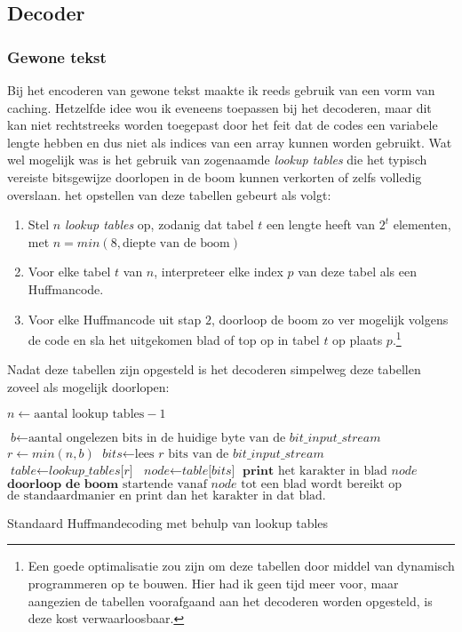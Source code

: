 \subsection{Decoder}

\subsubsection{Gewone tekst}
Bij het encoderen van gewone tekst maakte ik reeds gebruik van een vorm van caching. Hetzelfde idee wou ik eveneens toepassen bij het decoderen, maar dit kan niet rechtstreeks worden toegepast door het feit dat de codes een variabele lengte hebben en dus niet als indices van een array kunnen worden gebruikt. Wat wel mogelijk was is het gebruik van zogenaamde \emph{lookup tables} die het typisch vereiste bitsgewijze doorlopen in de boom kunnen verkorten of zelfs volledig overslaan. het opstellen van deze tabellen gebeurt als volgt:
\begin{enumerate}
	\item Stel $n$ \emph{lookup tables} op, zodanig dat tabel $t$ een lengte heeft van $2^t$ elementen, met $n = min(8, \text{diepte van de boom})$
	\item Voor elke tabel $t$ van $n$, interpreteer elke index $p$ van deze tabel als een Huffmancode.
	\item Voor elke Huffmancode uit stap $2$, doorloop de boom zo ver mogelijk volgens de code en sla het uitgekomen blad of top op in tabel $t$ op plaats $p$.\footnote{Een goede optimalisatie zou zijn om deze tabellen door middel van dynamisch programmeren op te bouwen. Hier had ik geen tijd meer voor, maar aangezien de tabellen voorafgaand aan het decoderen worden opgesteld, is deze kost verwaarloosbaar.}
\end{enumerate}
Nadat deze tabellen zijn opgesteld is het decoderen simpelweg deze tabellen zoveel als mogelijk doorlopen:
\begin{algorithm}
	\begin{algorithmic}[1]
		\State $\textit{n} \gets \text{aantal lookup tables} - 1$
		
		\State $\textit{b} \gets \text{aantal ongelezen bits in de huidige byte van de }\textit{bit\_input\_stream}$
		\State $\textit{r} \gets min(n, b)$
		\State $\textit{bits} \gets \text{lees }\textit{r}\text{ bits van de } \textit{bit\_input\_stream}$
		\State $\textit{table} \gets \textit{lookup\_tables[r]}$
		\State $\textit{node} \gets \textit{table[bits]}$
			\State $\textbf{print}\text{ het karakter in blad }\textit{node}$
		\Else
			\State $\textbf{doorloop de boom}\text{ startende vanaf }\textit{node}\text{ tot een blad wordt bereikt op}$
			\State $\text{de standaardmanier en print dan het karakter in dat blad.}$
		\EndIf
		\EndProcedure
	\end{algorithmic}
	\caption{Standaard Huffmandecoding met behulp van lookup tables}
\end{algorithm}


